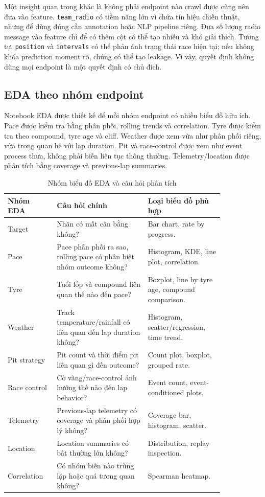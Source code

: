 \documentclass[conference]{IEEEtran}
\begin{document}
Một insight quan trọng khác là không phải endpoint nào crawl được cũng nên đưa vào feature. \texttt{team\_radio} có tiềm năng lớn vì chứa tín hiệu chiến thuật, nhưng để dùng đúng cần annotation hoặc NLP pipeline riêng. Đưa số lượng radio message vào feature chỉ để có thêm cột có thể tạo nhiễu và khó giải thích. Tương tự, \texttt{position} và \texttt{intervals} có thể phản ánh trạng thái race hiện tại; nếu không khóa prediction moment rõ, chúng có thể tạo leakage. Vì vậy, quyết định không dùng mọi endpoint là một quyết định có chủ đích.

\subsection{EDA theo nhóm endpoint}
Notebook EDA được thiết kế để mỗi nhóm endpoint có nhiều biểu đồ hữu ích. Pace được kiểm tra bằng phân phối, rolling trends và correlation. Tyre được kiểm tra theo compound, tyre age và cliff. Weather được xem vừa như phân phối riêng, vừa trong quan hệ với lap duration. Pit và race-control được xem như event process thưa, không phải biến liên tục thông thường. Telemetry/location được phân tích bằng coverage và previous-lap summaries.

\begin{table}[htbp]
\caption{Nhóm biểu đồ EDA và câu hỏi phân tích}
\label{tab:edaquestions}
\centering
\begin{tabular}{p{0.18\linewidth}p{0.36\linewidth}p{0.30\linewidth}}
\toprule
Nhóm EDA & Câu hỏi chính & Loại biểu đồ phù hợp \\
\midrule
Target & Nhãn có mất cân bằng không? & Bar chart, rate by progress. \\
Pace & Pace phân phối ra sao, rolling pace có phân biệt nhóm outcome không? & Histogram, KDE, line plot, correlation. \\
Tyre & Tuổi lốp và compound liên quan thế nào đến pace? & Boxplot, line by tyre age, compound comparison. \\
Weather & Track temperature/rainfall có liên quan đến lap duration không? & Histogram, scatter/regression, time trend. \\
Pit strategy & Pit count và thời điểm pit liên quan gì đến outcome? & Count plot, boxplot, grouped rate. \\
Race control & Cờ vàng/race-control ảnh hưởng thế nào đến lap behavior? & Event count, event-conditioned plots. \\
Telemetry & Previous-lap telemetry có coverage và phân phối hợp lý không? & Coverage bar, histogram, scatter. \\
Location & Location summaries có bất thường lớn không? & Distribution, replay inspection. \\
Correlation & Có nhóm biến nào trùng lặp hoặc quá tương quan không? & Spearman heatmap. \\
\bottomrule
\end{tabular}
\end{table}
\end{document}

